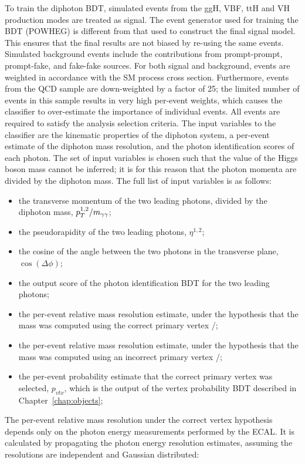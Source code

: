 To train the diphoton BDT, simulated events from the ggH, VBF, ttH 
and VH production modes are treated as signal. 
The event generator used for training the BDT (\textsc{POWHEG}) 
is different from that used to construct the final signal model.
This ensures that the final results are not biased by re-using the same events.
Simulated background events include the contributions from prompt-prompt, prompt-fake, 
and fake-fake sources.
For both signal and background, 
events are weighted in accordance with the SM process cross section.
Furthermore, events from the QCD sample are down-weighted by a factor of 25;
the limited number of events in this sample results in very high per-event weights, 
which causes the classifier to over-estimate the importance of individual events.
All events are required to satisfy the analysis selection criteria.
The input variables to the classifier are the kinematic properties of the diphoton system, 
a per-event estimate of the diphoton mass resolution, 
and the photon identification scores of each photon.
The set of input variables is chosen such that the value of the Higgs boson mass cannot be inferred;
it is for this reason that the photon momenta are divided by the diphoton mass.
The full list of input variables is as follows:
\begin{itemize}
\item the transverse momentum of the two leading photons, divided by the diphoton mass, $p_T^{1,2}/m_{\gamma\gamma}$;
\item the pseudorapidity of the two leading photons, $\eta^{1,2}$;
\item the cosine of the angle between the two photons in the transverse plane, $\cos{(\Delta\phi)}$;
\item the output score of the photon identification BDT for the two leading photons;
\item the per-event relative mass resolution estimate, 
      under the hypothesis that the mass was computed using the correct primary vertex \srv/\mgg;
\item the per-event relative mass resolution estimate, 
      under the hypothesis that the mass was computed using an incorrect primary vertex \swv/\mgg;
\item the per-event probability estimate that the correct primary vertex was selected, $p_{vtx}$,
      which is the output of the vertex probability BDT described in Chapter~\ref{chap:objects};
\end{itemize}

The per-event relative mass resolution under the correct vertex hypothesis 
depends only on the photon energy measurements performed by the ECAL.
It is calculated by propagating the photon energy resolution estimates, 
assuming the resolutions are independent and Gaussian distributed:

